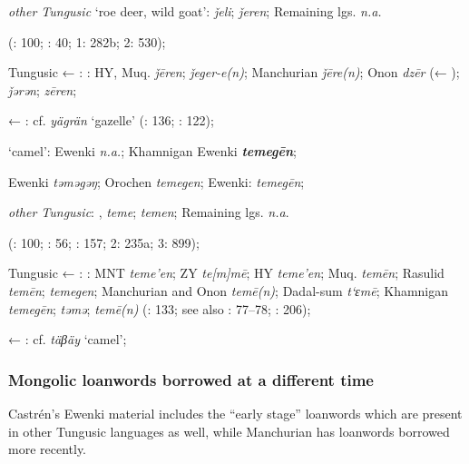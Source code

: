 \documentclass[output=paper,colorlinks,citecolor=brown]{langscibook}
\begin{document}
    \textit{other Tungusic} ‘roe deer, wild goat’:  \textit{ǰeli};  \textit{ǰeren}; Remaining lgs. \textit{n.a.}
    
    (\citealt{Janhunen1991}: 100; \citealt{Chaoke2014bB}: 40; \citealt{Cincius1975B} 1: 282b; \citealt{Hauer1952} 2: 530);

    Tungusic ← : : HY, Muq. \textit{ǰēren};  \textit{ǰeger{}-e(n)}; Manchurian  \textit{ǰēre(n)}; Onon  \textit{dzēr} (← );  \textit{ǰǝrǝn};  \textit{zēren};

     ← : cf.  \textit{yägrän} ‘gazelle’ (\citealt{Doerfer1985}: 136; \citealt{Rozycki1994}: 122);

    \ex ‘camel’:  Ewenki \textit{n.a.}; Khamnigan Ewenki \textbf{\textit{temegēn}};

     Ewenki \textit{tǝmǝgǝŋ}; Orochen \textit{temegen};  Ewenki:  \textit{temegēn};

    \textit{other Tungusic}: ,  \textit{teme};  \textit{temen}; Remaining lgs. \textit{n.a}. 
    
    (\citealt{Janhunen1991}: 100; \citealt{Chaoke2014bB}: 56; \citealt{Chaoke2014a}: 157; \citealt{Cincius1975B} 2: 235a; \citealt{Hauer1952} 3: 899);

    Tungusic ← : : MNT \textit{teme’en}; ZY \textit{te[m]mē}; HY \textit{teme’en}; Muq. \textit{temēn}; Rasulid \textit{temēn};  \textit{temegen}; Manchurian and Onon  \textit{temē(n)}; Dadal-sum  \textit{t`ɛmē};  Khamnigan \textit{temegēn};  \textit{tǝmǝ};  \textit{temē(n)} (\citealt{Khabtagaeva2017}: 133; see also \citealt{Doerfer1985}: 77--78; \citealt{Rozycki1994}: 206);

     ← : cf.  \textit{täβäy} ‘camel’;
\z
\z
\z


\subsubsection{Mongolic loanwords borrowed at a different time}

Castrén’s  Ewenki material includes the  “early stage” loanwords which are present in other Tungusic languages as well, while Manchurian  has  loanwords borrowed more recently.
\end{document}
